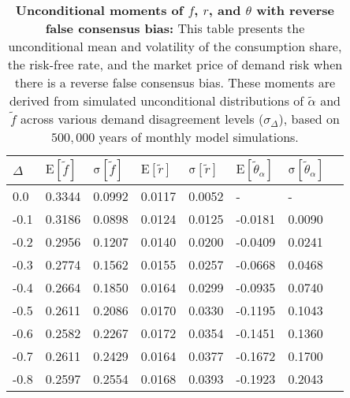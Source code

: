 \begin{table}[h!]
\centering
\caption{\textbf{Unconditional moments of $f$, $r$, and $\theta$ with reverse false consensus bias:} This table presents the unconditional mean and volatility of the consumption share, the risk-free rate, and the market price of demand risk when there is a reverse false consensus bias. These moments are derived from simulated unconditional distributions of $\tilde{\alpha}$ and $\tilde{f}$ across various demand disagreement levels ($\sigma_{\Delta}$), based on $500,000$ years of monthly model simulations.}
\begin{tabular}{|l|l|l|l|l|l|l|l|}
\hline
$\Delta$ & $\mathrm{E}[\tilde{f}]$ & $\mathrm{\sigma}[\tilde{f}]$ & $\mathrm{E}[\tilde{r}]$ & $\mathrm{\sigma}[\tilde{r}]$ 
& $\mathrm{E}[\tilde{\theta}_{\alpha}]$ & $\mathrm{\sigma}[\tilde{\theta}_{\alpha}]$ \\
\hline
0.0    & 0.3344 & 0.0992 & 0.0117 & 0.0052 & -      & -      \\
-0.1   & 0.3186 & 0.0898 & 0.0124 & 0.0125 & -0.0181  & 0.0090 \\
-0.2   & 0.2956 & 0.1207 & 0.0140 & 0.0200 & -0.0409  & 0.0241 \\
-0.3   & 0.2774 & 0.1562 & 0.0155 & 0.0257 & -0.0668  & 0.0468 \\
-0.4   & 0.2664 & 0.1850 & 0.0164 & 0.0299 & -0.0935  & 0.0740 \\
-0.5   & 0.2611 & 0.2086 & 0.0170 & 0.0330 & -0.1195  & 0.1043 \\
-0.6   & 0.2582 & 0.2267 & 0.0172 & 0.0354 & -0.1451  & 0.1360 \\
-0.7   & 0.2611 & 0.2429 & 0.0164 & 0.0377 & -0.1672  & 0.1700 \\
-0.8   & 0.2597 & 0.2554 & 0.0168 & 0.0393 & -0.1923 & 0.2043 \\
\hline
\end{tabular}
\end{table}

